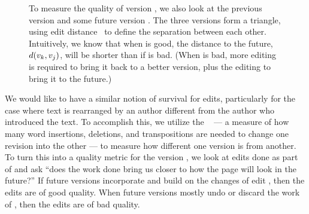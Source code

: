 \begin{figure}[t]
\centering
{}
\hspace{1ex}
\caption{To measure the quality of version , we also
	look at the previous version  and some future
	version .
	The three versions form a triangle, using
	edit distance~\cite{Levenshtein66} to define the separation
	between each other.
	Intuitively, we know that when  is good,
	the distance to the future, $d(v_{k},v_{j})$,
	will be shorter than if  is bad.
	(When  is bad, more editing is required to
	bring it back to a better version, plus the editing
	to bring it to the future.)
}
\label{fig-editcontr}
\end{figure}

  We would like to have a similar notion of survival for edits,
  particularly for the case where text is rearranged by an author
  different from the author who introduced the text.
  To accomplish this, we utilize the
  ~\cite{Levenshtein66,TichyEditDist,EditDistanceMoves,www07}
  --- a measure of how many word insertions, deletions,
  and transpositions are needed to change one revision into the other ---
  to measure how different one version is from another.
  To turn this into a quality metric for the
  version , we look at edits done as part of 
  and ask ``does the work done bring us closer to how the page
  will look in the future?''
  If future versions incorporate and build on the changes of edit ,
  then the edits are of good quality.
  When future versions mostly undo or discard the work of ,
  then the edits are of bad quality.

